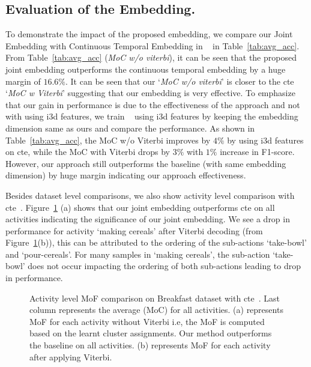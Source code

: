 \documentclass[final]{cvpr}
\begin{document}
\subsection{Evaluation of the Embedding.}
\label{sec:embed_eval}
To demonstrate the impact of the proposed embedding, we compare our Joint Embedding with Continuous Temporal Embedding in ~\cite{kukleva2019unsupervised} in Table~\ref{tab:avg_acc}. From Table~\ref{tab:avg_acc} (\textit{MoC w/o viterbi}), it can be seen that the proposed joint embedding outperforms the continuous temporal embedding by a huge margin of $16.6\%$. It can be seen that our `\textit{MoC w/o viterbi}' is closer to the {\sc cte} `\textit{MoC w Viterbi}' suggesting that our embedding is very effective. To emphasize that our gain in performance is due to the effectiveness of the approach and not with using {\sc i3d} features, we train ~\cite{kukleva2019unsupervised} using {\sc i3d} features by keeping the embedding dimension same as ours and compare the performance. As shown in Table~\ref{tab:avg_acc}, the MoC w/o Viterbi improves by $4\%$ by using {\sc i3d} features on {\sc cte}, while the MoC with Viterbi drops by $3\%$ with $1\%$ increase in F1-score. However, our approach still outperforms the baseline (with same embedding dimension) by huge margin indicating our approach effectiveness.

Besides dataset level comparisons, we also show activity level comparison with {\sc cte}~\cite{kukleva2019unsupervised}. Figure~\ref{fig:acc_bf} (a) shows that our joint embedding outperforms {\sc cte} on all activities indicating the significance of our joint embedding. 
We see a drop in performance for activity `making cereals' after Viterbi decoding (from Figure~\ref{fig:acc_bf}(b)), this can be attributed to the ordering of the sub-actions `take-bowl' and `pour-cereals'. For many samples in `making cereals', the sub-action `take-bowl' does not occur impacting the ordering of both sub-actions leading to drop in performance.

\begin{figure}[t]
\centering
\hfil
{}
\caption{{\small Activity level MoF comparison on Breakfast dataset with {\sc cte}~\cite{kukleva2019unsupervised}. Last column represents the average (MoC) for all activities. (a) represents MoF for each activity without Viterbi i.e, the MoF is computed based on the learnt cluster assignments. Our method outperforms the baseline on all activities. (b) represents MoF for each activity after applying Viterbi.
}}\vspace{-0.3cm}
\label{fig:acc_bf}
\end{figure}
\end{document}
